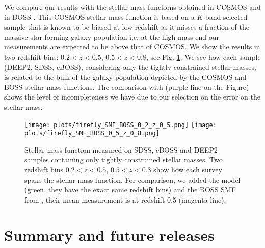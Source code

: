 \documentclass[onecolumn]{aa}
\begin{document}
We compare our results with the stellar mass functions obtained in COSMOS \citet{Ilbert2013SMF} and in BOSS \citep{Maraston2013}. 
This COSMOS stellar mass function is based on a $K$-band selected sample that is known to be biased at low redshift as it misses a fraction of the massive star-forming galaxy population i.e. at the high mass end our measurements are expected to be above that of COSMOS. 
We show the results in two redshift bins: $0.2<z<0.5$, $0.5<z<0.8$, see Fig. \ref{fig:smf:all}. 
We see how each sample (DEEP2, SDSS, eBOSS), considering only the tightly constrained stellar masses, is related to the bulk of the galaxy population depicted by the COSMOS and BOSS stellar mass functions. 
The comparison with \citet{Maraston2013} (purple line on the Figure) shows the level of incompleteness we have due to our selection on the error on the stellar mass. 


\begin{figure}
\begin{center}
\texttt{[image: plots/firefly\_SMF\_BOSS\_0\_2\_z\_0\_5.png]}
\texttt{[image: plots/firefly\_SMF\_BOSS\_0\_5\_z\_0\_8.png]}
\caption{\label{fig:smf:all}Stellar mass function measured on SDSS, eBOSS and DEEP2 samples containing only tightly constrained stellar masses. Two redshift bins $0.2<z<0.5$, $0.5<z<0.8$ show how each survey spans the stellar mass function. For comparison, we added the \citet{Ilbert2013SMF} model (green, they have the exact same redshift bins) and the BOSS SMF from \citet{Maraston2013}, their mean measurement is at redshift 0.5 (magenta line).}
\end{center}
\end{figure}

\clearpage
\section{Summary and future releases}
\end{document}
